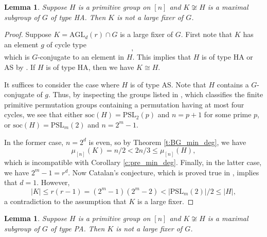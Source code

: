 \documentclass[twoside,a4paper,reqno,11pt]{amsart}
\newcommand{\<}{\langle}
\renewcommand{\>}{\rangle}
\newcommand{\leqs}{\leqslant}
\newcommand{\soc}{\mathrm{soc}}
\newcommand{\PSL}{\mathrm{PSL}}
\newtheorem{lem}[thm]{Lemma}
\theoremstyle{definition}
\begin{document}
	
	\begin{lem}
		\label{l:max_K=HA}
		Suppose $H$ is a primitive group on $[n]$ and $K\not\cong H$ is a maximal subgroup of $G$ of type HA. Then $K$ is not a large fixer of $G$.
	\end{lem}
	
	\begin{proof}
		Suppose $K = \mathrm{AGL}_d(r)\cap G$ is a large fixer of $G$. First note that $K$ has an element $g$ of cycle type
		\begin{equation*}
		[(r^d-1)/2,(r^d-1)/2,1],\
		\end{equation*}
		which is $G$-conjugate to an element in $H$. This implies that $H$ is of type HA or AS by \cite[Theorem 1.1]{GMPS_cycle}. If $H$ is of type HA, then we have $K\cong H$.
		
		It suffices to consider the case where $H$ is of type AS. Note that $H$ contains a $G$-conjugate of $g$. Thus, by inspecting the groups listed in \cite[Theorem 1.1]{GMPS_cycle}, which classifies the finite primitive permutation groups containing a permutation having at most four cycles, we see that either $\soc(H) = \PSL_2(p)$ and $n = p+1$ for some prime $p$, or $\soc(H) = \PSL_m(2)$ and $n = 2^m-1$.
		
		In the former case,	$n = 2^d$ is even, so by Theorem \ref{t:BG_min_deg}, we have
		\begin{equation*}
		\mu_{[n]}(K) = n/2 < 2n/3\leqs\mu_{[n]}(H),
		\end{equation*}
		which is incompatible with Corollary \ref{c:pre_min_deg}. Finally, in the latter case, we have $2^m - 1 = r^d$. Now Catalan's conjecture, which is proved true in \cite{M_Catalan}, implies that $d = 1$. However,
		\begin{equation*}
		|K|\leqs r(r-1) = (2^m-1)(2^m-2) < |\PSL_m(2)|/2 \leqs |H|,
		\end{equation*}
		a contradiction to the assumption that $K$ is a large fixer.
	\end{proof}
	
	\begin{lem}
		\label{l:max_K=PA}
		Suppose $H$ is a primitive group on $[n]$ and $K\not\cong H$ is a maximal subgroup of $G$ of type PA. Then $K$ is not a large fixer of $G$.
	\end{lem}
	
\end{document}
